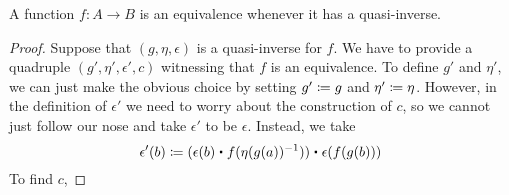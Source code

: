\begin{thm}
A function $f:A\to B$ is an equivalence whenever it has a quasi-inverse.
\end{thm}

\begin{proof}
Suppose that $(g,\eta,\epsilon)$ is a quasi-inverse for $f$. We have to provide
a quadruple $(g',\eta',\epsilon',c)$ witnessing that $f$ is an equivalence. To
define $g'$ and $\eta'$, we can just make the obvious choice by setting $g'
\coloneqq g$ and $\eta'\coloneqq \eta$. However, in the definition of $\epsilon'$ we
need to worry about the construction of $c$, so we cannot just follow our nose
and take $\epsilon'$ to be $\epsilon$. Instead, we take
\begin{equation*}
\epsilon'(b) \defeq (\epsilon(b)\ct f(\eta(g(a))^{-1}))\ct \epsilon(f(g(b)))
\end{equation*}
To find $c$, 
\end{proof}


